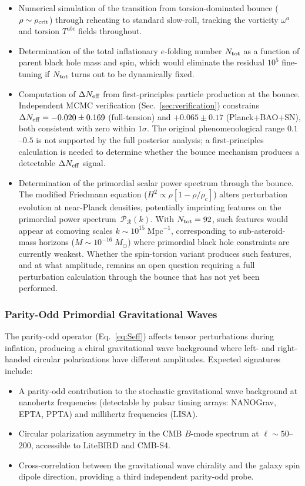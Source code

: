 \documentclass[aps,prd,twocolumn,superscriptaddress,showpacs,preprintnumbers,nofootinbib,longbibliography,floatfix]{revtex4-2}
\newcommand{\rhocrit}{\rho_{\rm crit}}
\newcommand{\Neff}{N_{\rm eff}}
\begin{document}
\begin{itemize}[leftmargin=*]
\item Numerical simulation of the transition from torsion-dominated bounce ($\rho\sim\rhocrit$) through reheating to standard slow-roll, tracking the vorticity $\omega^a$ and torsion $T^{abc}$ fields throughout.
\item Determination of the total inflationary $e$-folding number $N_{\rm tot}$ as a function of parent black hole mass and spin, which would eliminate the residual $10^5$ fine-tuning if $N_{\rm tot}$ turns out to be dynamically fixed.
\item Computation of $\Delta\Neff$ from first-principles particle production at the bounce. Independent MCMC verification (Sec.~\ref{sec:verification}) constrains $\Delta\Neff = -0.020 \pm 0.169$ (full-tension) and $+0.065 \pm 0.17$ (Planck+BAO+SN), both consistent with zero within $1\sigma$. The original phenomenological range $0.1$--$0.5$ is not supported by the full posterior analysis; a first-principles calculation is needed to determine whether the bounce mechanism produces a detectable $\Delta\Neff$ signal.
\item Determination of the primordial scalar power spectrum through the bounce. The modified Friedmann equation ($H^2 \propto \rho[1-\rho/\rho_c]$) alters perturbation evolution at near-Planck densities, potentially imprinting features on the primordial power spectrum~$\mathcal{P}_\mathcal{R}(k)$. With $N_{\rm tot} = 92$, such features would appear at comoving scales $k \sim 10^{15}\;\text{Mpc}^{-1}$, corresponding to sub-asteroid-mass horizons ($M \sim 10^{-16}\;M_\odot$) where primordial black hole constraints are currently weakest. Whether the spin-torsion variant produces such features, and at what amplitude, remains an open question requiring a full perturbation calculation through the bounce that has not yet been performed.
\end{itemize}

\subsubsection{Parity-Odd Primordial Gravitational Waves}

The parity-odd operator (Eq.~\ref{eq:Seff}) affects tensor perturbations during inflation, producing a chiral gravitational wave background where left- and right-handed circular polarizations have different amplitudes. Expected signatures include:

\begin{itemize}[leftmargin=*]
\item A parity-odd contribution to the stochastic gravitational wave background at nanohertz frequencies (detectable by pulsar timing arrays: NANOGrav, EPTA, PPTA) and millihertz frequencies (LISA).
\item Circular polarization asymmetry in the CMB $B$-mode spectrum at $\ell \sim 50$--$200$, accessible to LiteBIRD and CMB-S4.
\item Cross-correlation between the gravitational wave chirality and the galaxy spin dipole direction, providing a third independent parity-odd probe.
\end{itemize}
\end{document}
